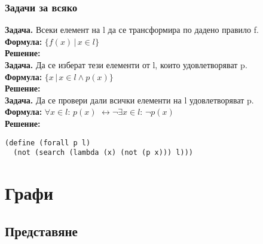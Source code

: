\documentclass{beamer}
\begin{document}
\begin{frame}[fragile]
  \frametitle{Задачи за всяко}
  \textbf{Задача.} Всеки елемент на l да се трансформира по дадено правило f.\\
  \pause
  \textbf{Формула:} $\{f(x)\,|\,x \in l \}$\\
  \pause
  \textbf{Решение:} \\[1em]
  \pause
  \textbf{Задача.} Да се изберат тези елементи от l, които удовлетворяват p.\\
  \pause
  \textbf{Формула:} $\{x\,|\,x \in l \wedge p(x) \}$\\
  \pause
  \textbf{Решение:} \\[1em]
  \pause
  \textbf{Задача.} Да се провери дали всички елементи на l удовлетворяват p.\\
  \pause
  \textbf{Формула:} $\forall x\in l:\,p(x)$ \pause $\leftrightarrow \neg \exists x\in l:\,\neg p(x)$\\
  \pause
  \textbf{Решение:}
\begin{lstlisting}
(define (forall p l)
  (not (search (lambda (x) (not (p x))) l)))
\end{lstlisting}
\end{frame}

\section{Графи}

\usetikzlibrary{graphs,arrows.meta}

\newcommand{\samplegraph}{%
\begin{tikzpicture}[>=LaTeX,every node/.style={draw,circle,fill=diagramblue},scale=1.2]
  \node (1) at (1,2)     {1};
  \node (2) at (3,2.2)   {2};
  \node (3) at (2,1)     {3};
  \node (4) at (0.8,0.2) {4};
  \node (5) at (2.5,0)   {5};
  \node (6) at (3.5,1.2)   {6};
  \graph {
    (1) -> {(2), (3)};
    (2) -> {(3), (6)};
    (3) -> {(4), (6)};
    (4) -> {(1), (5)};
    (5) -> (3);
    (6) -> (5);
  };
\end{tikzpicture}}

\subsection{Представяне}
\end{document}
